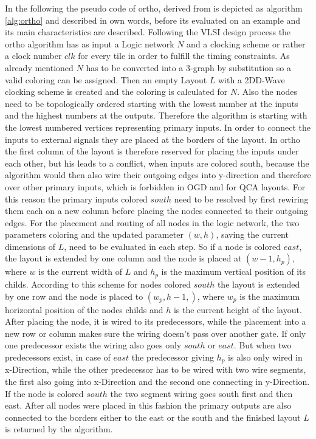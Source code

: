 In the following the pseudo code of ortho, derived from \cite{ortho} is depicted as algorithm \ref{alg:ortho} and described in own words, before its evaluated on an example and its main characteristics are described. Following the VLSI design process the ortho algorithm has as input a Logic network $N$ and a clocking scheme or rather a clock number $clk$ for every tile in order to fulfill the timing constraints. As already mentioned $N$ has to be converted into a 3-graph by substitution so a valid coloring can be assigned. Then an empty Layout $L$ with a 2DD-Wave clocking scheme is created and the coloring is calculated for $N$. Also the nodes need to be topologically ordered starting with the lowest number at the inputs and the highest numbers at the outputs. Therefore the algorithm is starting with the lowest numbered vertices representing primary inputs. In order to connect the inputs to external signals they are placed at the borders of the layout. In ortho the first column of the layout is therefore reserved for placing the inputs under each other, but his leads to a conflict, when inputs are colored south, because the algorithm would then also wire their outgoing edges into y-direction and therefore over other primary inputs, which is forbidden in OGD and for QCA layouts. For this reason the primary inputs colored $south$ need to be resolved by first rewiring them each on a new column before placing the nodes connected to their outgoing edges. For the placement and routing of all nodes in the logic network, the two parameters coloring and the updated parameter $(w, h)$, saving the current dimensions of $L$, need to be evaluated in each step. So if a node is colored $east$, the layout is extended by one column and the node is placed at $(w-1, h_p)$, where $w$ is the current width of $L$ and $h_p$ is the maximum vertical position of its childs. According to this scheme for nodes colored $south$ the layout is extended by one row and the node is placed to $(w_p, h-1,)$, where $w_p$ is the maximum horizontal position of the nodes childs and $h$ is the current height of the layout. After placing the node, it is wired to its predecessors, while the placement into a new row or column makes sure the wiring doesn't pass over another gate. If only one predecessor exists the wiring also goes only $south$ or $east$. But when two predecessors exist, in case of $east$ the predecessor giving $h_p$ is also only wired in x-Direction, while the other predecessor has to be wired with two wire segments, the first also going into x-Direction and the second one connecting in y-Direction. If the node is colored $south$ the two segment wiring goes south first and then east. After all nodes were placed in this fashion the primary outputs are also connected to the borders either to the east or the south and the finished layout $L$ is returned by the algorithm.\\


